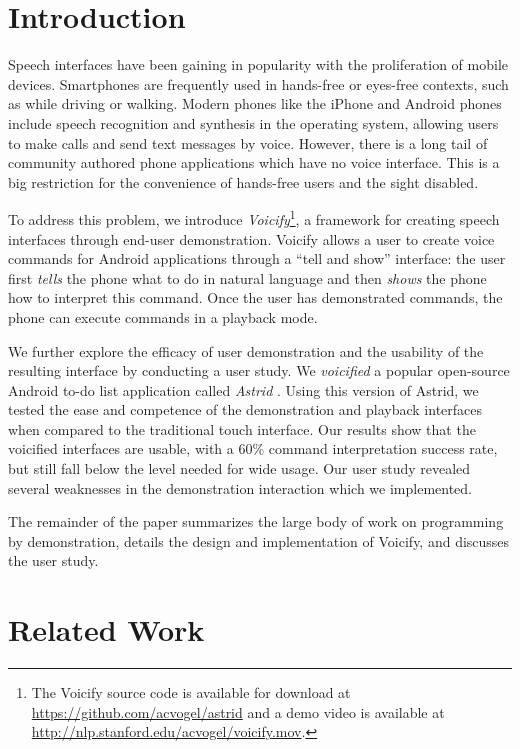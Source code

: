 \documentclass[letterpaper]{article}
\begin{document}
\section{Introduction}
Speech interfaces have been gaining in popularity with the proliferation of mobile devices. Smartphones are
frequently used in hands-free or eyes-free contexts, such as while driving or walking. Modern phones like
the iPhone and Android phones include speech recognition and synthesis in the operating system, allowing
users to make calls and send text messages by voice. However, there is a long tail of community authored
phone applications which have no voice interface. This is a big restriction for the convenience of
hands-free users and the sight disabled. 

To address this problem, we introduce \emph{Voicify}\footnote{The Voicify source code is available for download at \url{https://github.com/acvogel/astrid} and a demo video is available at \url{http://nlp.stanford.edu/acvogel/voicify.mov}.}, a framework for creating speech interfaces 
through end-user demonstration. Voicify allows a user to create voice commands for Android
applications through a ``tell and show'' interface: the user first \emph{tells} the phone what 
to do in natural language and then \emph{shows} the phone how to interpret this command.
Once the user has demonstrated commands, the phone can execute commands in a playback mode.

We further explore the efficacy of user demonstration and the usability of the resulting
interface by conducting a user study.  We \emph{voicified} a popular open-source Android to-do list
application called \emph{Astrid} \cite{astrid}. Using this version of Astrid, we tested the ease and
competence of the demonstration and playback interfaces when compared to the traditional touch
interface. Our results show that the voicified interfaces are usable, with a 60\% command interpretation
success rate, but still fall below the level needed for wide usage. Our user study revealed
several weaknesses in the demonstration interaction which we implemented.


The remainder of the paper summarizes the large body of work on programming by demonstration, details
the design and implementation of Voicify, and discusses the user study.





\section{Related Work}
\end{document}
